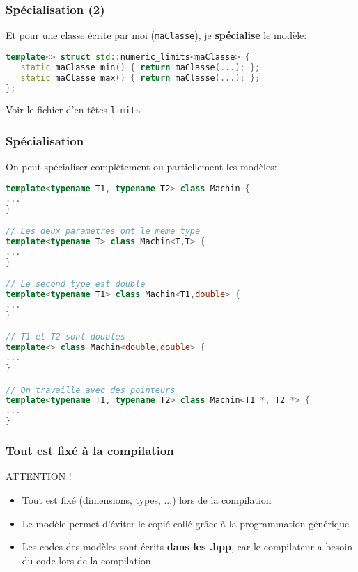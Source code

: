 \documentclass{beamer}
\begin{document}
\begin{frame}[fragile=singleslide,shrink=20]
\frametitle {Spécialisation (2)}

Et pour une classe écrite par moi (\texttt{maClasse}), je \textbf{spécialise} le modèle:

\begin{lstlisting}[language=c++]
template<> struct std::numeric_limits<maClasse> {
   static maClasse min() { return maClasse(...); };
   static maClasse max() { return maClasse(...); };
};
\end{lstlisting}

Voir le fichier d'en-têtes \texttt{limits}

\end{frame}

\begin{frame}[fragile=singleslide,shrink=20]
\frametitle {Spécialisation}

On peut spécialiser complètement ou partiellement les modèles:

\begin{lstlisting}[language=c++]
template<typename T1, typename T2> class Machin {
...
}

// Les deux parametres ont le meme type
template<typename T> class Machin<T,T> {
...
}

// Le second type est double
template<typename T1> class Machin<T1,double> {
...
}

// T1 et T2 sont doubles
template<> class Machin<double,double> {
...
}

// On travaille avec des pointeurs
template<typename T1, typename T2> class Machin<T1 *, T2 *> {
...
}
\end{lstlisting}

\end{frame}

\begin{frame}
\frametitle {Tout est fixé à la compilation}

\begin{block}{ATTENTION !}
\begin{itemize}
\item{Tout est fixé (dimensions, types, ...) lors de la compilation}
\item{Le modèle permet d'éviter le copié-collé grâce à la programmation générique}
\item{Les codes des modèles sont écrits \textbf{dans les .hpp}, car le compilateur a besoin du code lors de la compilation}
\end{itemize}
\end{block}

\end{frame}
\end{document}
